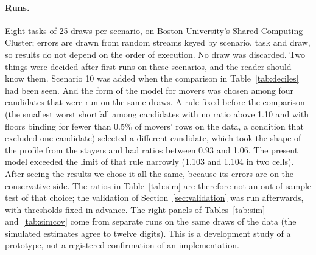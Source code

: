 \paragraph{Runs.} Eight tasks of 25 draws per scenario, on Boston University's Shared Computing Cluster; errors
are drawn from random streams keyed by scenario, task and draw, so results do not depend on the order of
execution. No draw was discarded. Two things were decided after first runs on these scenarios, and the reader
should know them. Scenario 10 was added when the comparison in Table~\ref{tab:deciles} had been seen. And the
form of the model for movers was chosen among four candidates that were run on the same draws. A rule fixed
before the comparison (the smallest worst shortfall among candidates with no ratio above 1.10 and with floors
binding for fewer than 0.5\% of movers' rows on the data, a condition that excluded one candidate) selected a
different candidate, which took the shape of the profile from the stayers and had ratios between 0.93 and
1.06. The present model exceeded the limit of that rule narrowly (1.103 and 1.104 in two cells). After seeing
the results we chose it all the same, because its errors are on the conservative side. The ratios in
Table~\ref{tab:sim} are therefore not an out-of-sample test of that choice; the validation of
Section~\ref{sec:validation} was run afterwards, with thresholds fixed in advance.
The right panels of Tables~\ref{tab:sim} and~\ref{tab:simcov} come from separate runs on the same draws of the
data (the simulated estimates agree to twelve digits). This
is a development study of a prototype, not a registered confirmation of an implementation.

